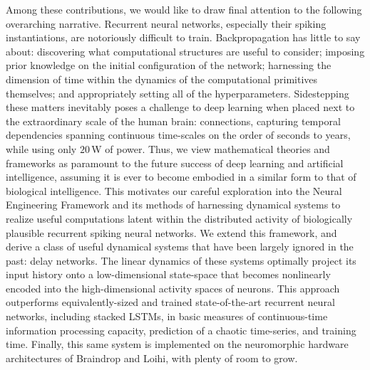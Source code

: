 Among these contributions, we would like to draw final attention to the following overarching narrative.
Recurrent neural networks, especially their spiking instantiations, are notoriously difficult to train.
Backpropagation has little to say about: discovering what computational structures are useful to consider; imposing prior knowledge on the initial configuration of the network; harnessing the dimension of time within the dynamics of the computational primitives themselves; and appropriately setting all of the hyperparameters.
Sidestepping these matters inevitably poses a challenge to deep learning when placed next to the extraordinary scale of the human brain:  connections, capturing temporal dependencies spanning continuous time-scales on the order of seconds to years, while using only $20$\,W of power.
Thus, we view mathematical theories and frameworks as paramount to the future success of deep learning and artificial intelligence, assuming it is ever to become embodied in a similar form to that of biological intelligence.
This motivates our careful exploration into the Neural Engineering Framework and its methods of harnessing dynamical systems to realize useful computations latent within the distributed activity of biologically plausible recurrent spiking neural networks.
We extend this framework, and derive a class of useful dynamical systems that have been largely ignored in the past: delay networks.
The linear dynamics of these systems optimally project its input history onto a low-dimensional state-space that becomes nonlinearly encoded into the high-dimensional activity spaces of neurons.
This approach outperforms equivalently-sized and trained state-of-the-art recurrent neural networks, including stacked LSTMs, in basic measures of continuous-time information processing capacity, prediction of a chaotic time-series, and training time.
Finally, this same system is implemented on the neuromorphic hardware architectures of Braindrop and Loihi, with plenty of room to grow.



